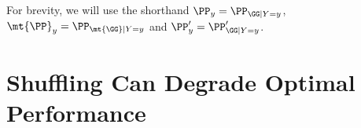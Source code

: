 \documentclass[10pt,journal,cspaper,compsoc]{IEEEtran}
\begin{document}
% 
% 
% 
% 
% 
% 
% 
% 
% 
% 

For brevity, we will use the shorthand $\PP_y=\PP_{\GG | Y = y}$, $\mt{\PP}_y=\PP_{\mt{\GG} | Y = y}$ and $\PP'_y=\PP_{\GG|Y=y}'$. 






\section{Shuffling Can Degrade Optimal Performance} %
\label{sec:shuffle}
\end{document}
